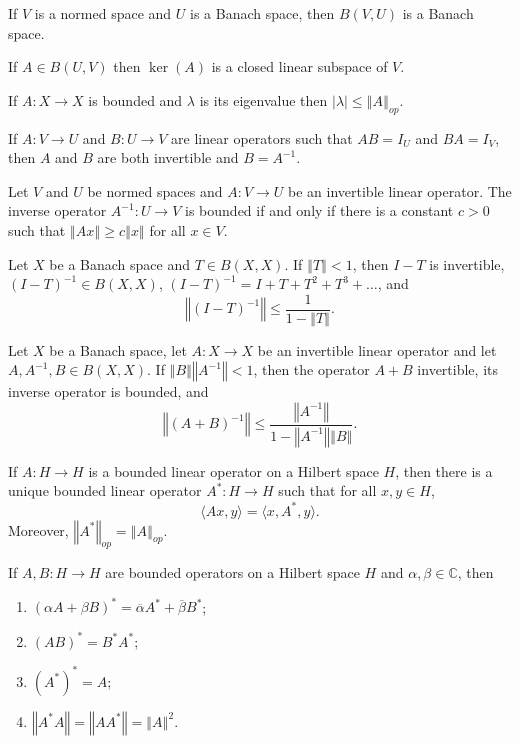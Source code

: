\documentclass[a4paper]{article}
\renewcommand{\C}{\mathbb{C}}
\newcommand{\norm}[1]{\left\Vert #1 \right\Vert}
\newcommand{\oneover}[1]{\frac{1}{#1}}
\newcommand{\<}{\langle}
\renewcommand{\>}{\rangle}
\renewcommand{\a}{\alpha}
\renewcommand{\b}{\beta}
\newcommand{\la}{\lambda}
\newcommand{\inv}{^{-1}}
\begin{document}
\begin{thm}
  If $V$ is a normed space and $U$ is a Banach space, then $B(V,U)$ is a Banach space.
\end{thm}

\begin{prop}
  If $A\in B(U,V)$ then $\ker(A)$ is a closed linear subspace of $V$.
\end{prop}

\begin{prop}
  If $A:X\to X$ is bounded and $\la$ is its eigenvalue then $|\la|\leq\norm{A}_{op}$.
\end{prop}

\begin{lemma}
  If $A:V\to U$ and $B:U\to V$ are linear operators such that $AB=I_U$ and $BA=I_V$, then $A$ and $B$ are both invertible and $B=A^{-1}$.
\end{lemma}

\begin{prop}
  Let $V$ and $U$ be normed spaces and $A:V\to U$ be an invertible linear operator. The inverse operator $A^{-1}:U\to V$ is bounded if and only if there is a constant $c>0$ such that $\norm{Ax}\geq c\norm{x}$ for all $x\in V$.
\end{prop}

\begin{lemma}
  Let $X$ be a Banach space and $T\in B(X,X)$. If $\norm{T}<1$, then $I-T$ is invertible, $(I-T)\inv\in B(X,X)$, $(I-T)\inv = I+T+T^2+T^3+\ldots$, and
  $$\norm{(I-T)\inv}\leq \oneover{1-\norm{T}}.$$
\end{lemma}

\begin{prop}
  Let $X$ be a Banach space, let $A:X\to X$ be an invertible linear operator and let $A,A\inv,B\in B(X,X)$. If $\norm{B}\norm{A\inv}<1$, then the operator $A+B$ invertible, its inverse operator is bounded, and
  $$\norm{(A+B)\inv}\leq\frac{\norm{A\inv}}{1-\norm{A\inv}\norm{B}}.$$
\end{prop}

\begin{thm}
  If $A:H\to H$ is a bounded linear operator on a Hilbert space $H$, then there is a unique bounded linear operator $A^*:H\to H$ such that for all $x,y\in H$,
  $$\<Ax,y\> = \<x,A^*,y\>.$$
  Moreover, $\norm{A^*}_{op} = \norm{A}_{op}$.
\end{thm}

\begin{lemma}
  If $A,B:H\to H$ are bounded operators on a Hilbert space $H$ and $\a,\b\in\C$, then
  \begin{enumerate}
    \item $(\a A+\b B)^* = \overline{\a}A^* + \overline{\b}B^*$;
    \item $(AB)^* = B^*A^*$;
    \item $(A^*)^* = A$;
    \item $\norm{A^*A} = \norm{AA^*} = \norm{A}^2$.
  \end{enumerate}
\end{lemma}
\end{document}

